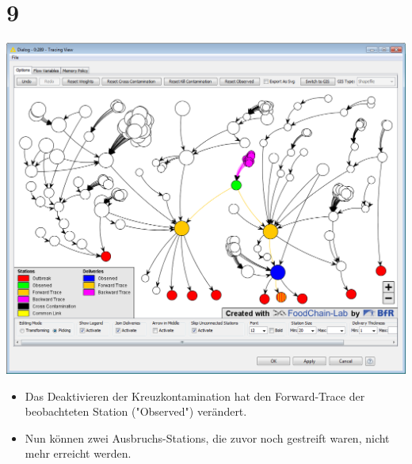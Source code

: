 \documentclass{beamer}
\begin{document}
\section{9}
\begin{frame}
	\begin{center}
  		\includegraphics[height=0.6\textheight]{9.png}
	\end{center}
	\begin{itemize}
		\item Das Deaktivieren der Kreuzkontamination hat den Forward-Trace der beobachteten Station ("Observed") verändert.
		\item Nun können zwei Ausbruchs-Stations, die zuvor noch gestreift waren, nicht mehr erreicht werden.
	\end{itemize}
\end{frame}
\end{document}
